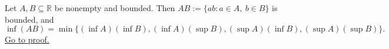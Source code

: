 \begin{theorem}
\label{thm:infimum-product-set}
Let $A,B\subseteq\mathbb{R}$ be nonempty and bounded.  Then
$AB:=\{ab:a\in A,\ b\in B\}$ is bounded, and
\[
  \inf(AB)=
  \min\{(\inf A)(\inf B),(\inf A)(\sup B),(\sup A)(\inf B),(\sup A)(\sup B)\}.
\]
\hyperref[prf:infimum-product-set]{Go to proof.}
\end{theorem}
